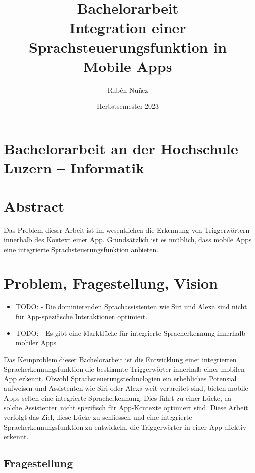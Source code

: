 \documentclass[11pt,a4paper]{article}
\title{
{\LARGE Bachelorarbeit}\\[2em]
{\textbf{Integration einer Sprachsteuerungsfunktion {\break} in Mobile Apps}}
}
\author{Rubén Nuñez}
\date{Herbstsemester 2023}
\begin{document}
\maketitle
\thispagestyle{empty} %
\newpage

\section*{Bachelorarbeit an der Hochschule Luzern -- Informatik}

\newpage

\newpage \section*{Abstract}
Das Problem dieser Arbeit ist im wesentlichen die Erkennung von Triggerwörtern innerhalb
des Kontext einer App. Grundsätzlich ist es unüblich, dass mobile Apps eine
integrierte Sprachsteuerungsfunktion anbieten. 


\newpage
\tableofcontents

\newpage

\newpage \section{Problem, Fragestellung, Vision}

\begin{itemize}
\item TODO: - Die dominierenden Sprachassistenten wie Siri und Alexa sind nicht für App-spezifische 
Interaktionen optimiert.
\item TODO: - Es gibt eine Marktlücke für integrierte Spracherkennung innerhalb mobiler Apps.
\end{itemize}

\noindent
Das Kernproblem dieser Bachelorarbeit ist die Entwicklung einer integrierten
Spracherkennungsfunktion die bestimmte Triggerwörter innerhalb einer mobilen App erkennt. Obwohl
Sprachsteuerungstechnologien ein erhebliches Potenzial aufweisen und Assistenten wie Siri oder
Alexa weit verbreitet sind, bieten mobile Apps selten eine integrierte Spracherkennung. Dies führt
zu einer Lücke, da solche Assistenten nicht spezifisch für App-Kontexte optimiert sind.
Diese Arbeit verfolgt das Ziel, diese Lücke zu schliessen und eine integrierte
Spracherkennungsfunktion zu entwickeln, die Triggerwörter in einer App effektiv erkennt.

\subsection{Fragestellung}
\end{document}
